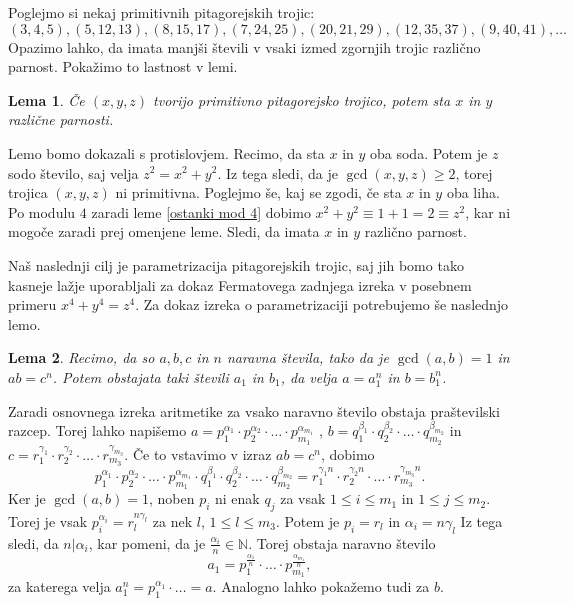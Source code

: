 \documentclass[12pt, a4paper]{article}
\newtheorem{lema}{Lema}
\newcommand{\N}{\mathbb N}
\begin{document}
Poglejmo si nekaj primitivnih pitagorejskih trojic: $$(3, 4, 5), (5, 12, 13), (8, 15, 17), (7, 24, 25), (20, 21, 29), (12, 35, 37), (9, 40, 41), \ldots$$Opazimo lahko, da imata manjši števili v vsaki izmed zgornjih trojic različno parnost. Pokažimo to lastnost v lemi.

\begin{lema}\label{parnost x,y}
Če $(x, y, z)$ tvorijo primitivno pitagorejsko trojico, potem sta $x$ in $y$ različne parnosti. 
\end{lema}
\proof
Lemo bomo dokazali s protislovjem. Recimo, da sta $x$ in $y$ oba soda. Potem je $z$ sodo število, saj velja $z^2=x^2+y^2$. Iz tega sledi, da je $\gcd (x,y,z) \geq 2$, torej trojica $(x, y, z)$ ni primitivna. Poglejmo še, kaj se zgodi, če sta $x$ in $y$ oba liha. Po modulu $4$ zaradi leme \ref{ostanki mod 4} dobimo $x^2+y^2 \equiv 1+1=2 \equiv z^2$, kar ni mogoče zaradi prej omenjene leme.
Sledi, da imata $x$ in $y$ različno parnost. 
\endproof

Naš naslednji cilj je parametrizacija pitagorejskih trojic, saj jih bomo tako kasneje lažje uporabljali za dokaz Fermatovega zadnjega izreka v posebnem primeru $x^4 + y^4 = z^4$. Za dokaz izreka o parametrizaciji potrebujemo še naslednjo lemo.

\begin{lema}\label{ab=cn}
Recimo, da so $a, b, c$ in $n$ naravna števila, tako da je $\gcd(a, b) = 1$ in $ab=c^n$. Potem obstajata taki števili $a_1$ in $b_1$, da velja $a=a_1^n$ in $b=b_1^n$. 
\end{lema}
\proof
Zaradi osnovnega izreka aritmetike za vsako naravno število obstaja praštevilski razcep. Torej lahko napišemo $a=p_1^{\alpha_1} \cdot p_2^{\alpha_2} \cdot \ldots \cdot p_{m_1}^{\alpha_{m_1}}$ ,  $b=q_1^{\beta_1} \cdot q_2^{\beta_2} \cdot \ldots \cdot q_{m_2}^{\beta_{m_2}}$ in $c=r_1^{\gamma_1} \cdot r_2^{\gamma_2} \cdot \ldots \cdot r_{m_3}^{\gamma_{m_3}}$. Če to vstavimo v izraz $ab=c^n$, dobimo $$p_1^{\alpha_1} \cdot p_2^{\alpha_2} \cdot \ldots \cdot p_{m_1}^{\alpha_{m_1}} \cdot q_1^{\beta_1} \cdot q_2^{\beta_2} \cdot \ldots \cdot q_{m_2}^{\beta_{m_2}}= r_1^{\gamma_1 n} \cdot r_2^{\gamma_2 n} \cdot \ldots \cdot r_{m_3}^{\gamma_{m_3} n}.$$Ker je $\gcd (a, b)=1$, noben $p_i$ ni enak $q_j$ za vsak $1 \leq i \leq m_1$ in $1 \leq j \leq m_2$. 
Torej je vsak $p_i^{\alpha_i}=r_l^{n \gamma_l}$ za nek $l$, $1 \leq l \leq m_3$. Potem je $p_i=r_l$ in $\alpha_i=n \gamma_l$ Iz tega sledi, da $n|\alpha_i$, kar pomeni, da je $\frac{\alpha_i}{n} \in \N$. Torej obstaja naravno število $$a_1=p_1^{\frac{\alpha_1}{n}} \cdot \ldots \cdot p_{m_1}^{\frac{\alpha_{m_1}}{n}},$$ za katerega velja $a_1^n=p_1^{\alpha_1} \cdot \ldots =a$. Analogno lahko pokažemo tudi za $b$.
\endproof
\end{document}
